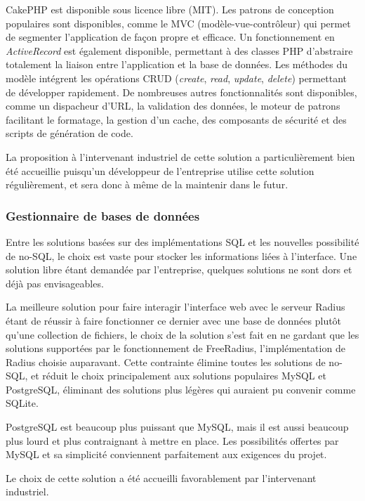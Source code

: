 CakePHP est disponible sous licence libre (MIT). Les patrons de conception populaires sont disponibles, comme le MVC (modèle-vue-contrôleur) qui permet de segmenter l'application de façon propre et efficace. Un fonctionnement en \textit{ActiveRecord} est également disponible, permettant à des classes PHP d'abstraire totalement la liaison entre l'application et la base de données. Les méthodes du modèle intégrent les opérations CRUD (\textit{create}, \textit{read}, \textit{update}, \textit{delete}) permettant de développer rapidement. De nombreuses autres fonctionnalités sont disponibles, comme un dispacheur d'URL, la validation des données, le moteur de patrons facilitant le formatage, la gestion d'un cache, des composants de sécurité et des scripts de génération de code.

La proposition à l'intervenant industriel de cette solution a particulièrement bien été accueillie puisqu'un développeur de l'entreprise utilise cette solution régulièrement, et sera donc à même de la maintenir dans le futur.

\subsubsection{Gestionnaire de bases de données}

Entre les solutions basées sur des implémentations SQL et les nouvelles possibilité de no-SQL, le choix est vaste pour stocker les informations liées à l'interface. Une solution libre étant demandée par l'entreprise, quelques solutions ne sont dors et déjà pas envisageables. 

La meilleure solution pour faire interagir l'interface web avec le serveur Radius étant de réussir à faire fonctionner ce dernier avec une base de données plutôt qu'une collection de fichiers, le choix de la solution s'est fait en ne gardant que les solutions supportées par le fonctionnement de FreeRadius, l'implémentation de Radius choisie auparavant. Cette contrainte élimine toutes les solutions de no-SQL, et réduit le choix principalement aux solutions populaires MySQL et PostgreSQL, éliminant des solutions plus légères qui auraient pu convenir comme SQLite.

PostgreSQL est beaucoup plus puissant que MySQL, mais il est aussi beaucoup plus lourd et plus contraignant à mettre en place. Les possibilités offertes par MySQL et sa simplicité conviennent parfaitement aux exigences du projet.

Le choix de cette solution a été accueilli favorablement par l'intervenant industriel.

